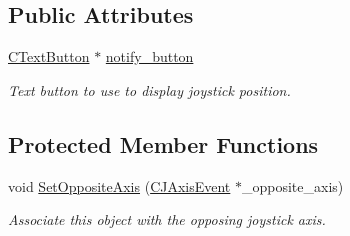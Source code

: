 \subsection*{Public Attributes}
\begin{DoxyCompactItemize}
\item 
\hypertarget{classCJAxisEvent_a44cbf08bc0468daffe05f967810851f0}{\hyperlink{classCTextButton}{C\-Text\-Button} $\ast$ \hyperlink{classCJAxisEvent_a44cbf08bc0468daffe05f967810851f0}{notify\-\_\-button}}\label{classCJAxisEvent_a44cbf08bc0468daffe05f967810851f0}

\begin{DoxyCompactList}\small\item\em Text button to use to display joystick position. \end{DoxyCompactList}\end{DoxyCompactItemize}
\subsection*{Protected Member Functions}
\begin{DoxyCompactItemize}
\item 
\hypertarget{classCJAxisEvent_afdb866161b2dc0dd1d8a5331f9d39117}{void \hyperlink{classCJAxisEvent_afdb866161b2dc0dd1d8a5331f9d39117}{Set\-Opposite\-Axis} (\hyperlink{classCJAxisEvent}{C\-J\-Axis\-Event} $\ast$\-\_\-opposite\-\_\-axis)}\label{classCJAxisEvent_afdb866161b2dc0dd1d8a5331f9d39117}

\begin{DoxyCompactList}\small\item\em Associate this object with the opposing joystick axis. \end{DoxyCompactList}\end{DoxyCompactItemize}
